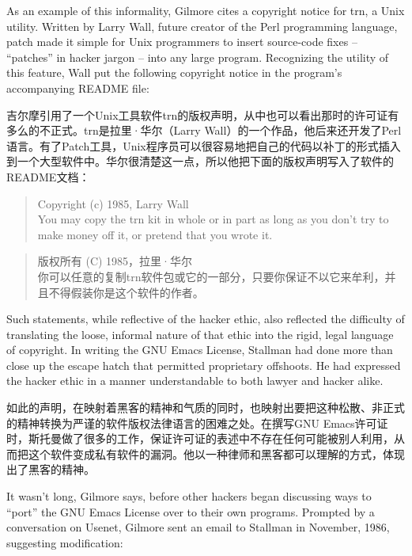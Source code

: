 \ifdefined\eng
As an example of this informality, Gilmore cites a copyright notice for trn, a Unix utility. Written by Larry Wall, future creator of the Perl programming language, patch made it simple for Unix programmers to insert source-code fixes -- ``patches'' in hacker jargon -- into any large program. Recognizing the utility of this feature, Wall put the following copyright notice in the program's accompanying README file:
\fi

\ifdefined\chs
吉尔摩引用了一个Unix工具软件trn的版权声明，从中也可以看出那时的许可证有多么的不正式。trn是拉里·华尔（Larry Wall）的一个作品，他后来还开发了Perl语言。有了Patch工具，Unix程序员可以很容易地把自己的代码以补丁的形式插入到一个大型软件中。华尔很清楚这一点，所以他把下面的版权声明写入了软件的README文档：
\fi

\ifdefined\eng
\begin{quote}
Copyright (c) 1985, Larry Wall\\
You may copy the trn kit in whole or in part as long as you don't try to make money off it, or pretend that you wrote it.
\end{quote}
\fi

\ifdefined\chs
\begin{quote}
版权所有 (C) 1985，拉里·华尔\\
你可以任意的复制trn软件包或它的一部分，只要你保证不以它来牟利，并且不得假装你是这个软件的作者。
\end{quote}
\fi

\ifdefined\eng
Such statements, while reflective of the hacker ethic, also reflected the difficulty of translating the loose, informal nature of that ethic into the rigid, legal language of copyright. In writing the GNU Emacs License, Stallman had done more than close up the escape hatch that permitted proprietary offshoots. He had expressed the hacker ethic in a manner understandable to both lawyer and hacker alike.
\fi

\ifdefined\chs
如此的声明，在映射着黑客的精神和气质的同时，也映射出要把这种松散、非正式的精神转换为严谨的软件版权法律语言的困难之处。在撰写GNU Emacs许可证时，斯托曼做了很多的工作，保证许可证的表述中不存在任何可能被别人利用，从而把这个软件变成私有软件的漏洞。他以一种律师和黑客都可以理解的方式，体现出了黑客的精神。
\fi

\ifdefined\eng
It wasn't long, Gilmore says, before other hackers began discussing ways to ``port'' the GNU Emacs License over to their own programs. Prompted by a conversation on Usenet, Gilmore sent an email to Stallman in November, 1986, suggesting modification:
\fi

